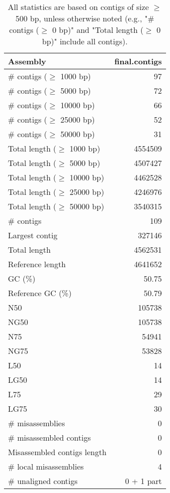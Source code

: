 \documentclass[12pt,a4paper]{article}
\begin{document}
\begin{table}[ht]
\begin{center}
\caption{All statistics are based on contigs of size $\geq$ 500 bp, unless otherwise noted (e.g., "\# contigs ($\geq$ 0 bp)" and "Total length ($\geq$ 0 bp)" include all contigs).}
\begin{tabular}{|l*{1}{|r}|}
\hline
Assembly & final.contigs \\ \hline
\# contigs ($\geq$ 1000 bp) & 97 \\ \hline
\# contigs ($\geq$ 5000 bp) & 72 \\ \hline
\# contigs ($\geq$ 10000 bp) & 66 \\ \hline
\# contigs ($\geq$ 25000 bp) & 52 \\ \hline
\# contigs ($\geq$ 50000 bp) & 31 \\ \hline
Total length ($\geq$ 1000 bp) & 4554509 \\ \hline
Total length ($\geq$ 5000 bp) & 4507427 \\ \hline
Total length ($\geq$ 10000 bp) & 4462528 \\ \hline
Total length ($\geq$ 25000 bp) & 4246976 \\ \hline
Total length ($\geq$ 50000 bp) & 3540315 \\ \hline
\# contigs & 109 \\ \hline
Largest contig & 327146 \\ \hline
Total length & 4562531 \\ \hline
Reference length & 4641652 \\ \hline
GC (\%) & 50.75 \\ \hline
Reference GC (\%) & 50.79 \\ \hline
N50 & 105738 \\ \hline
NG50 & 105738 \\ \hline
N75 & 54941 \\ \hline
NG75 & 53828 \\ \hline
L50 & 14 \\ \hline
LG50 & 14 \\ \hline
L75 & 29 \\ \hline
LG75 & 30 \\ \hline
\# misassemblies & 0 \\ \hline
\# misassembled contigs & 0 \\ \hline
Misassembled contigs length & 0 \\ \hline
\# local misassemblies & 4 \\ \hline
\# unaligned contigs & 0 + 1 part \\ \hline

\end{tabular}
\end{center}
\end{table}
\end{document}
